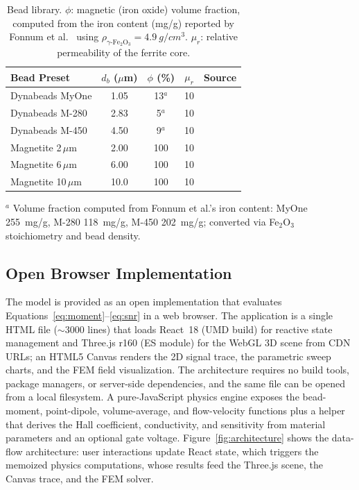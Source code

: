 \documentclass[biosensors,article,submit,pdftex,moreauthors]{Definitions/mdpi}
\begin{document}
\begin{table}[H]
\caption{Bead library. $\phi$: magnetic (iron oxide) volume fraction, computed from
the iron content (mg/g) reported by Fonnum et al.\ \cite{fonnum2005} using
$\rho_{\gamma\text{-Fe}_2\text{O}_3} = \SI{4.9}{g/cm^3}$. $\mu_r$: relative
permeability of the ferrite core.\label{tab:beads}}
\begin{tabularx}{\textwidth}{lCCCX}
\toprule
\textbf{Bead Preset} & \boldmath$d_b$ \textbf{($\mu$m)} &
\boldmath$\phi$ \textbf{(\%)} & \boldmath$\mu_r$ & \textbf{Source} \\
\midrule
Dynabeads MyOne   & 1.05 & 13$^{a}$ & 10 & \cite{fonnum2005} \\
Dynabeads M-280   & 2.83 & 5$^{a}$  & 10 & \cite{fonnum2005} \\
Dynabeads M-450   & 4.50 & 9$^{a}$  & 10 & \cite{fonnum2005} \\
Magnetite 2\,$\mu$m  & 2.00 & 100 & 10 & \cite{govindaraju2025} \\
Magnetite 6\,$\mu$m  & 6.00 & 100 & 10 & \cite{govindaraju2025} \\
Magnetite 10\,$\mu$m & 10.0 & 100 & 10 & \cite{govindaraju2025} \\
\bottomrule
\end{tabularx}
\noindent\footnotesize{$^{a}$ Volume fraction computed from Fonnum et al.'s iron
content: MyOne \SI{255}{mg/g}, M-280 \SI{118}{mg/g}, M-450 \SI{202}{mg/g};
converted via Fe$_2$O$_3$ stoichiometry and bead density.}
\end{table}

\subsection{Open Browser Implementation}
\label{sec:implementation}

The model is provided as an open implementation that evaluates
Equations~\eqref{eq:moment}--\eqref{eq:snr} in a web browser. The application is a
single HTML file (${\sim}\num{3000}$ lines) that loads React~18 (UMD build) for
reactive state management and Three.js r160 (ES module) for the WebGL 3D scene from
CDN URLs; an HTML5 Canvas renders the 2D signal trace, the parametric sweep charts,
and the FEM field visualization. The architecture requires no build tools, package
managers, or server-side dependencies, and the same file can be opened from a local
filesystem. A pure-JavaScript physics engine exposes the bead-moment,
point-dipole, volume-average, and flow-velocity functions plus a helper that derives
the Hall coefficient, conductivity, and sensitivity from material parameters and an
optional gate voltage. Figure~\ref{fig:architecture} shows the data-flow
architecture: user interactions update React state, which triggers the memoized
physics computations, whose results feed the Three.js scene, the Canvas trace, and
the FEM solver.
\end{document}
